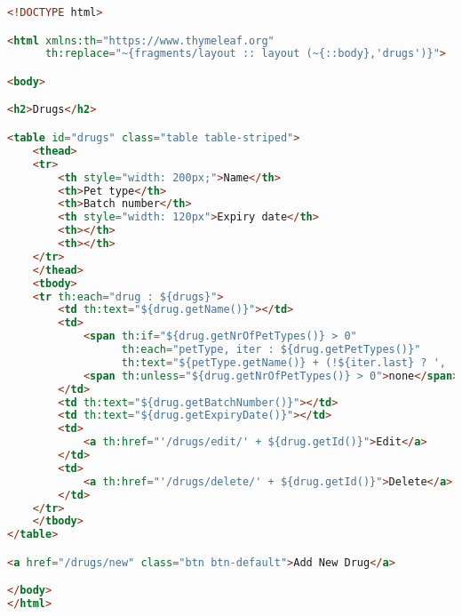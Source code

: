\documentclass[12pt, a4paper]{article}
\begin{document}
\begin{lstlisting}[language=HTML, title='drugsList.html']
<!DOCTYPE html>

<html xmlns:th="https://www.thymeleaf.org"
      th:replace="~{fragments/layout :: layout (~{::body},'drugs')}">

<body>

<h2>Drugs</h2>

<table id="drugs" class="table table-striped">
    <thead>
    <tr>
        <th style="width: 200px;">Name</th>
        <th>Pet type</th>
        <th>Batch number</th>
        <th style="width: 120px">Expiry date</th>
        <th></th>
        <th></th>
    </tr>
    </thead>
    <tbody>
    <tr th:each="drug : ${drugs}">
        <td th:text="${drug.getName()}"></td>
        <td>
            <span th:if="${drug.getNrOfPetTypes()} > 0"
                  th:each="petType, iter : ${drug.getPetTypes()}"
                  th:text="${petType.getName()} + (!${iter.last} ? ', ' : '')"></span>
            <span th:unless="${drug.getNrOfPetTypes()} > 0">none</span>
        </td>
        <td th:text="${drug.getBatchNumber()}"></td>
        <td th:text="${drug.getExpiryDate()}"></td>
        <td>
            <a th:href="'/drugs/edit/' + ${drug.getId()}">Edit</a>
        </td>
        <td>
            <a th:href="'/drugs/delete/' + ${drug.getId()}">Delete</a>
        </td>
    </tr>
    </tbody>
</table>

<a href="/drugs/new" class="btn btn-default">Add New Drug</a>

</body>
</html>
\end{lstlisting}
\end{document}
